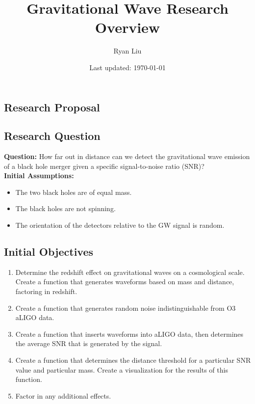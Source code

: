 \documentclass[10pt]{article}
\title{Gravitational Wave Research Overview}
\author{Ryan Liu}
\date{Last updated: \today}
\begin{document}
\maketitle

\begin{multicols*}{2}

\section{Research Proposal}

\subsection{Research Question}

\textbf{Question:} How far out in distance can we detect the gravitational wave emission of a black hole merger given a specific signal-to-noise ratio (SNR)? \\

\textbf{Initial Assumptions:}
\begin{itemize}
    \setlength\itemsep{0pt}
    \item The two black holes are of equal mass.
    \item The black holes are not spinning.
    \item The orientation of the detectors relative to the GW signal is random. 
\end{itemize}

\subsection{Initial Objectives}

\begin{enumerate}
    \item Determine the redshift effect on gravitational waves on a cosmological scale. Create a function that generates waveforms based on mass and distance, factoring in redshift. 
    \item Create a function that generates random noise indistinguishable from O3 aLIGO data. 
    \item Create a function that inserts waveforms into aLIGO data, then determines the average SNR that is generated by the signal. 
    \item Create a function that determines the distance threshold for a particular SNR value and particular mass. Create a visualization for the results of this function. 
    \item Factor in any additional effects. 
\end{enumerate}


\end{multicols*}
\end{document}
